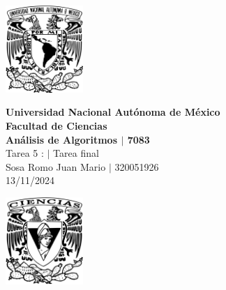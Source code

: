 \begin{center}
    \begin{minipage}{3cm}
    	\begin{center}
    		\includegraphics[height=3.3cm]{src/Img/Logo_UNAM.png}
    	\end{center}
    \end{minipage}\hfill
    \begin{minipage}{10cm}
    	\begin{center}
    	\textbf{\large Universidad Nacional Autónoma de México}\\[0.1cm]
        \textbf{Facultad de Ciencias}\\[0.1cm]
        \textbf{Análisis de Algoritmos  $|$ 7083}\\[0.1cm]
        Tarea 5 : $|$ Tarea final\\[0.1cm]
        Sosa Romo Juan Mario $|$ 320051926 \\[0.1cm]
        13/11/2024
    	\end{center}
    \end{minipage}\hfill
    \begin{minipage}{3cm}
    	\begin{center}
    		\includegraphics[height=3.3cm]{src/Img/Logo_FC.png}
    	\end{center}
    \end{minipage}
\end{center}

